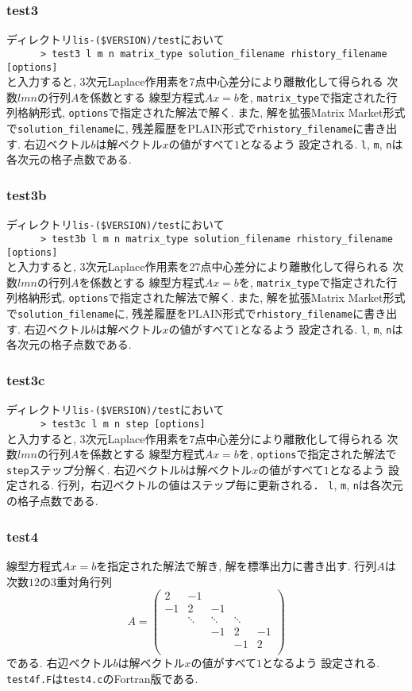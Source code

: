 \documentclass[a4paper]{jarticle}
\begin{document}
{{\subsubsection{test3}
ディレクトリ{\tt lis-(\$VERSION)/test}において\\
 \verb+      > test3 l m n matrix_type solution_filename rhistory_filename [options]+\\
と入力すると, 3次元Laplace作用素を7点中心差分により離散化して得られる
次数$lmn$の行列$A$を係数とする
線型方程式$Ax=b$を, \verb|matrix_type|で指定された行列格納形式, 
{\tt options}で指定された解法で解く. また, 
解を拡張Matrix Market形式で{\tt solution\_filename}に, 
残差履歴をPLAIN形式で{\tt rhistory\_filename}に書き出す.
右辺ベクトル$b$は解ベクトル$x$の値がすべて$1$となるよう
設定される. {\tt l}, {\tt m}, {\tt n}は各次元の格子点数である. 

\subsubsection{test3b}
ディレクトリ{\tt lis-(\$VERSION)/test}において\\
 \verb+      > test3b l m n matrix_type solution_filename rhistory_filename [options]+\\
と入力すると, 3次元Laplace作用素を27点中心差分により離散化して得られる
次数$lmn$の行列$A$を係数とする
線型方程式$Ax=b$を, \verb|matrix_type|で指定された行列格納形式, 
{\tt options}で指定された解法で解く. また, 
解を拡張Matrix Market形式で{\tt solution\_filename}に, 
残差履歴をPLAIN形式で{\tt rhistory\_filename}に書き出す.
右辺ベクトル$b$は解ベクトル$x$の値がすべて$1$となるよう
設定される. {\tt l}, {\tt m}, {\tt n}は各次元の格子点数である. 

\subsubsection{test3c}
ディレクトリ{\tt lis-(\$VERSION)/test}において\\
 \verb+      > test3c l m n step [options]+\\
と入力すると, 3次元Laplace作用素を7点中心差分により離散化して得られる
次数$lmn$の行列$A$を係数とする
線型方程式$Ax=b$を, {\tt options}で指定された解法で{\tt step}ステップ分解く.
右辺ベクトル$b$は解ベクトル$x$の値がすべて$1$となるよう
設定される. 行列，右辺ベクトルの値はステップ毎に更新される．
{\tt l}, {\tt m}, {\tt n}は各次元の格子点数である. 
　
\subsubsection{test4}
線型方程式$Ax=b$を指定された解法で解き, 解を標準出力に書き出す. 
行列$A$は次数$12$の3重対角行列
\[
A = 
\left(
\begin{array}{ccccc}
2 & -1 &   &  &   \\
-1 & 2 & -1 &  &   \\
  & \ddots  & \ddots  & \ddots  &   \\
  &   & -1 & 2 & -1 \\
  &   &   & -1 & 2 \\
\end{array}
\right)
\]
である. 右辺ベクトル$b$は解ベクトル$x$の値がすべて$1$となるよう
設定される. 
{\tt test4f.F}は{\tt test4.c}のFortran版である. 

}}
\end{document}
